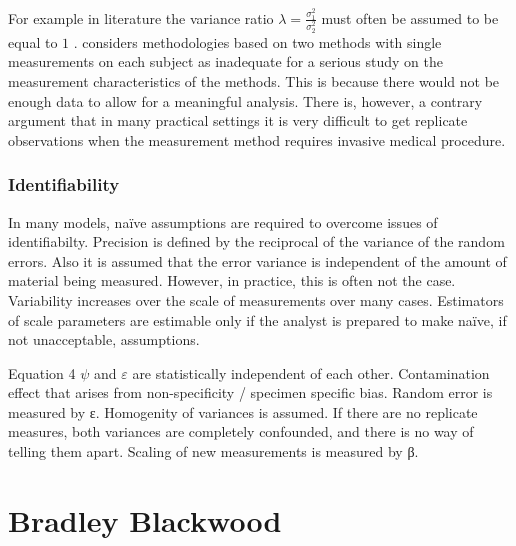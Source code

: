 \documentclass[12pt, a4paper]{report}
\theoremstyle{plain}
\theoremstyle{definition}
\theoremstyle{remark}
\begin{document}
For example in literature the variance
ratio $\lambda=\frac{\sigma^{2}_{1}}{\sigma^{2}_{2}}$
must often be assumed to be equal to $1$ \citep{linnet98}.\citet{DunnSEME} considers methodologies based on two methods with single measurements on each subject as inadequate for a serious
study on the measurement characteristics of the methods. This is
because there would not be enough data to allow for a meaningful
analysis. There is, however, a contrary argument that in many
practical settings it is very difficult to get replicate
observations when the measurement method requires invasive medical
procedure.


\subsection{Identifiability}
In many models,  naïve assumptions are required to overcome issues of identifiabilty.
Precision is defined by the reciprocal of the variance of the random errors. 
Also it is assumed that the error variance is independent of the amount of material being measured. However, in practice, this is often not the case. Variability increases over the scale of measurements over many cases.
Estimators of scale parameters are estimable only if the analyst is prepared to make naïve, if not unacceptable, assumptions.

Equation 4 
$\psi$  and $\varepsilon$ are statistically independent of each other.
Contamination effect that arises from non-specificity /  specimen specific bias.
Random error is measured by ε. Homogenity of variances is assumed.
If there are no replicate measures,  both variances are completely confounded, and there is no way of telling them apart.
Scaling of new measurements is measured by β.


	\chapter{Bradley Blackwood}
\end{document}
